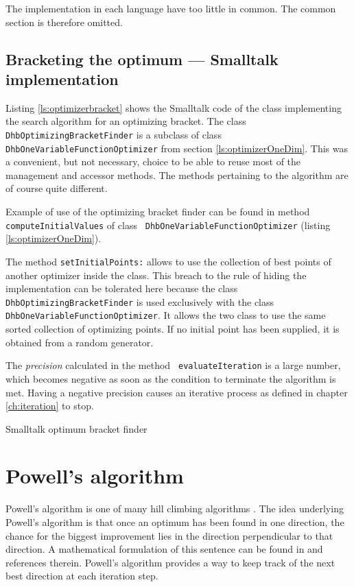 \documentclass[twoside]{book}
\begin{document}
\noindent The implementation in each language have too little in
common. The common section is therefore omitted.

\subsection{Bracketing the optimum --- Smalltalk implementation}
\label{sec:sbracket}  Listing
\ref{ls:optimizerbracket} shows the Smalltalk code of the class
implementing the search algorithm for an optimizing bracket. The
class {\tt DhbOptimizingBracketFinder} is a subclass of class {\tt
DhbOneVariableFunctionOptimizer} from section
\ref{ls:optimizerOneDim}. This was a convenient, but not
necessary, choice to be able to reuse most of the management and
accessor methods. The methods pertaining to the algorithm are of
course quite different.

Example of use of the optimizing bracket finder can be found in
method {\tt computeInitialValues} of class {\tt
DhbOneVariableFunctionOptimizer} (\cf listing
\ref{ls:optimizerOneDim}).

The method {\tt setInitialPoints:} allows to use the collection of
best points of another optimizer inside the class. This breach to
the rule of hiding the implementation can be tolerated here
because the class {\tt DhbOptimizingBracketFinder} is used
exclusively with the class {\tt DhbOneVariableFunctionOptimizer}.
It allows the two class to use the same sorted collection of
optimizing points. If no initial point has been supplied, it is
obtained from a random generator.

The {\sl precision} calculated in the method {\tt
evaluateIteration} is a large number, which becomes negative as
soon as the condition to terminate the algorithm is met. Having a
negative precision causes an iterative process as defined in
chapter \ref{ch:iteration} to stop.

\begin{listing} Smalltalk optimum bracket finder \label{ls:optimizerbracket}

\end{listing}


\section{Powell's algorithm}
\label{sec:powell}Powell's algorithm is one of many hill climbing
algorithms \cite{Press}. The idea underlying Powell's algorithm is
that once an optimum has been found in one direction, the chance
for the biggest improvement lies in the direction perpendicular to
that direction. A mathematical formulation of this sentence can be
found in \cite{Press} and references therein. Powell's algorithm
provides a way to keep track of the next best direction at each
iteration step.
\end{document}
